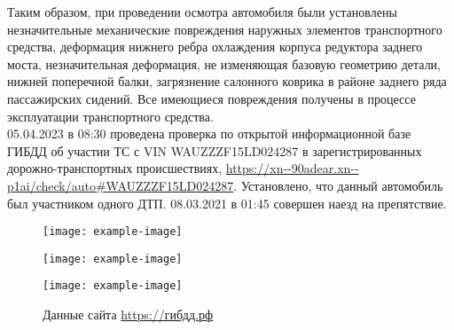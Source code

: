    Таким образом, при проведении  осмотра автомобиля были установлены незначительные механические повреждения наружных элементов  транспортного средства, деформация нижнего  ребра охлаждения корпуса редуктора заднего моста, незначительная деформация, не изменяющая базовую геометрию детали, нижней поперечной балки,   загрязнение салонного коврика в районе заднего ряда пассажирских сидений. Все имеющиеся повреждения  получены в процессе эксплуатации транспортного средства.\\
   05.04.2023 в 08:30  проведена проверка  по открытой информационной базе ГИБДД об участии ТС с VIN  WAUZZZF15LD024287 в зарегистрированных дорожно-транспортных происшествиях, \url{https://xn--90adear.xn--p1ai/check/auto#WAUZZZF15LD024287}. Установлено, что данный автомобиль был участником одного ДТП. 08.03.2021 в 01:45   совершен наезд на препятствие. 
   \begin{figure}[H]
   	\centering
   	\texttt{[image: example-image]}
   \end{figure}
\begin{figure}[H]
	\centering
	\texttt{[image: example-image]}
\end{figure}
\begin{figure}[H]
	\centering
	\texttt{[image: example-image]}
	\caption{Данные сайта \url{https://гибдд.рф}}
	\label{гибдд}
\end{figure}  
   
